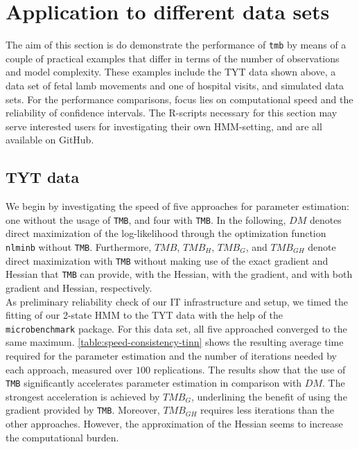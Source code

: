\documentclass[bimj,fleqn]{w-art}\usepackage[]{graphicx}\usepackage[]{color}
\theoremstyle{plain}
\theoremstyle{definition}
\begin{document}
\section{Application to different data sets}
\label{sec:application_datasets}

The aim of this section is do demonstrate the performance of \texttt{tmb} by means of a couple of practical examples that differ in terms of the number of observations and model complexity. These examples include the TYT data shown above, a data set of fetal lamb movements and one of hospital visits, and simulated data sets. For the performance comparisons, focus lies on computational speed and the reliability of confidence intervals. The R-scripts necessary for this section may serve interested users for investigating their own HMM-setting, and are all available on GitHub.



\subsection{TYT data}
\label{sec:tyt_data}

We begin by investigating the speed of five approaches for parameter estimation: one without the usage of {\tt{TMB}}, and four with {\tt{TMB}}. In the following, $DM$ denotes direct maximization of the log-likelihood through the optimization function \texttt{nlminb} without {\tt{TMB}}. Furthermore, $TMB$, $TMB_H$, $TMB_G$, and $TMB_{GH}$ denote direct maximization with {\tt{TMB}} without making use of the exact gradient and Hessian that {\tt{TMB}} can provide, with the Hessian, with the gradient, and with both gradient and Hessian, respectively.\\
As preliminary reliability check of our IT infrastructure and setup, we timed the fitting of our 2-state HMM to the TYT data with the help of the {\tt{microbenchmark}} package. For this data set, all five approached converged to the same maximum. \autoref{table:speed-consistency-tinn} shows the resulting average time required for the parameter estimation and the number of iterations needed by each approach, measured over $100$ replications. The results show that the use of {\tt{TMB}} significantly accelerates parameter estimation in comparison with $DM$. The strongest acceleration is achieved by $TMB_G$, underlining the benefit of using the gradient provided by {\tt{TMB}}. Moreover, $TMB_{GH}$ requires less iterations than the other approaches. However, the approximation of the Hessian seems to increase the computational burden.\\ [1ex]     
\end{document}
